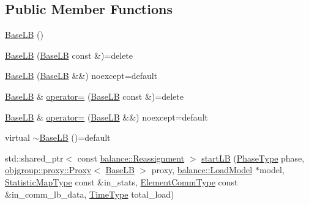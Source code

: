 \subsection*{Public Member Functions}
\begin{DoxyCompactItemize}
\item 
\hyperlink{structvt_1_1vrt_1_1collection_1_1lb_1_1_base_l_b_a87135398833442f612e4221cf8d242a9}{Base\+LB} ()
\item 
\hyperlink{structvt_1_1vrt_1_1collection_1_1lb_1_1_base_l_b_af34c68c8ecf1341189a67c3405036d16}{Base\+LB} (\hyperlink{structvt_1_1vrt_1_1collection_1_1lb_1_1_base_l_b}{Base\+LB} const \&)=delete
\item 
\hyperlink{structvt_1_1vrt_1_1collection_1_1lb_1_1_base_l_b_a1d1ae8a311e14e27b26624caee930535}{Base\+LB} (\hyperlink{structvt_1_1vrt_1_1collection_1_1lb_1_1_base_l_b}{Base\+LB} \&\&) noexcept=default
\item 
\hyperlink{structvt_1_1vrt_1_1collection_1_1lb_1_1_base_l_b}{Base\+LB} \& \hyperlink{structvt_1_1vrt_1_1collection_1_1lb_1_1_base_l_b_a94be0abcbc47bf6a3f3685f94dd5d4cb}{operator=} (\hyperlink{structvt_1_1vrt_1_1collection_1_1lb_1_1_base_l_b}{Base\+LB} const \&)=delete
\item 
\hyperlink{structvt_1_1vrt_1_1collection_1_1lb_1_1_base_l_b}{Base\+LB} \& \hyperlink{structvt_1_1vrt_1_1collection_1_1lb_1_1_base_l_b_a1e092a34c8e4eda0a05ab3a2f5a9ae45}{operator=} (\hyperlink{structvt_1_1vrt_1_1collection_1_1lb_1_1_base_l_b}{Base\+LB} \&\&) noexcept=default
\item 
virtual \hyperlink{structvt_1_1vrt_1_1collection_1_1lb_1_1_base_l_b_a2d4e31b7ae227886a24443334114269e}{$\sim$\+Base\+LB} ()=default
\item 
std\+::shared\+\_\+ptr$<$ const \hyperlink{structvt_1_1vrt_1_1collection_1_1balance_1_1_reassignment}{balance\+::\+Reassignment} $>$ \hyperlink{structvt_1_1vrt_1_1collection_1_1lb_1_1_base_l_b_ab9765675eb8432b21fb78f54a169d0af}{start\+LB} (\hyperlink{namespacevt_a46ce6733d5cdbd735d561b7b4029f6d7}{Phase\+Type} phase, \hyperlink{structvt_1_1objgroup_1_1proxy_1_1_proxy}{objgroup\+::proxy\+::\+Proxy}$<$ \hyperlink{structvt_1_1vrt_1_1collection_1_1lb_1_1_base_l_b}{Base\+LB} $>$ proxy, \hyperlink{structvt_1_1vrt_1_1collection_1_1balance_1_1_load_model}{balance\+::\+Load\+Model} $\ast$model, \hyperlink{structvt_1_1vrt_1_1collection_1_1lb_1_1_base_l_b_acd9bdad961ac83c96b7a227de672f96c}{Statistic\+Map\+Type} const \&in\+\_\+stats, \hyperlink{structvt_1_1vrt_1_1collection_1_1lb_1_1_base_l_b_a83eb4daec14edfb8780422e95b8e38d3}{Element\+Comm\+Type} const \&in\+\_\+comm\+\_\+lb\+\_\+data, \hyperlink{namespacevt_a876a9d0cd5a952859c72de8a46881442}{Time\+Type} total\+\_\+load)

\end{DoxyCompactItemize}
